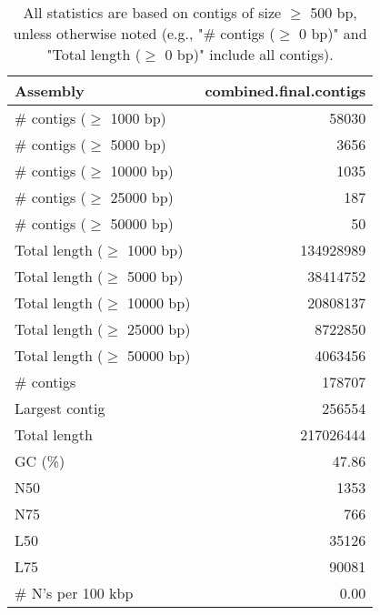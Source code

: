 \documentclass[12pt,a4paper]{article}
\begin{document}
\begin{table}[ht]
\begin{center}
\caption{All statistics are based on contigs of size $\geq$ 500 bp, unless otherwise noted (e.g., "\# contigs ($\geq$ 0 bp)" and "Total length ($\geq$ 0 bp)" include all contigs).}
\begin{tabular}{|l*{1}{|r}|}
\hline
Assembly & combined.final.contigs \\ \hline
\# contigs ($\geq$ 1000 bp) & 58030 \\ \hline
\# contigs ($\geq$ 5000 bp) & 3656 \\ \hline
\# contigs ($\geq$ 10000 bp) & 1035 \\ \hline
\# contigs ($\geq$ 25000 bp) & 187 \\ \hline
\# contigs ($\geq$ 50000 bp) & 50 \\ \hline
Total length ($\geq$ 1000 bp) & 134928989 \\ \hline
Total length ($\geq$ 5000 bp) & 38414752 \\ \hline
Total length ($\geq$ 10000 bp) & 20808137 \\ \hline
Total length ($\geq$ 25000 bp) & 8722850 \\ \hline
Total length ($\geq$ 50000 bp) & 4063456 \\ \hline
\# contigs & 178707 \\ \hline
Largest contig & 256554 \\ \hline
Total length & 217026444 \\ \hline
GC (\%) & 47.86 \\ \hline
N50 & 1353 \\ \hline
N75 & 766 \\ \hline
L50 & 35126 \\ \hline
L75 & 90081 \\ \hline
\# N's per 100 kbp & 0.00 \\ \hline
\end{tabular}
\end{center}
\end{table}
\end{document}
